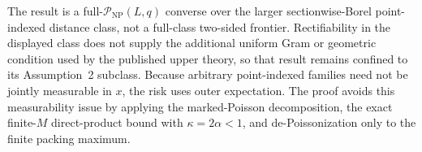 The result is a full-\(\mathcal P_{\mathrm{NP}}(L,q)\) converse over the larger sectionwise-Borel point-indexed distance class, not a full-class two-sided frontier.  Rectifiability in the displayed class does not supply the additional uniform Gram or geometric condition used by the published upper theory, so that result remains confined to its Assumption~2 subclass.  Because arbitrary point-indexed families need not be jointly measurable in \(x\), the risk uses outer expectation.  The proof avoids this measurability issue by applying the marked-Poisson decomposition, the exact finite-\(M\) direct-product bound with \(\kappa=2\alpha<1\), and de-Poissonization only to the finite packing maximum.